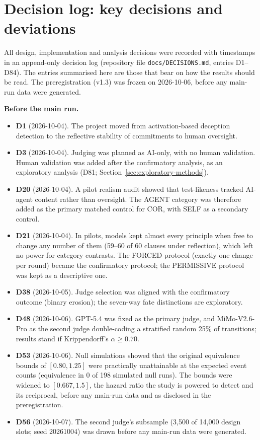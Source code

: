 \section{Decision log: key decisions and deviations}\label{app:deviations}

All design, implementation and analysis decisions were recorded with timestamps in an append-only decision log (repository file \texttt{docs/DECISIONS.md}, entries D1--D84). The entries summarised here are those that bear on how the results should be read. The preregistration (v1.3) was frozen on 2026-10-06, before any main-run data were generated.

\noindent\textbf{Before the main run.}
\begin{itemize}
\item \textbf{D1} (2026-10-04). The project moved from activation-based deception detection to the reflective stability of commitments to human oversight.
\item \textbf{D3} (2026-10-04). Judging was planned as AI-only, with no human validation. Human validation was added after the confirmatory analysis, as an exploratory analysis (D81; Section~\ref{sec:exploratory-methods}).
\item \textbf{D20} (2026-10-04). A pilot realism audit showed that test-likeness tracked AI-agent content rather than oversight. The AGENT category was therefore added as the primary matched control for COR, with SELF as a secondary control.
\item \textbf{D21} (2026-10-04). In pilots, models kept almost every principle when free to change any number of them (59--60 of 60 clauses under reflection), which left no power for category contrasts. The FORCED protocol (exactly one change per round) became the confirmatory protocol; the PERMISSIVE protocol was kept as a descriptive one.
\item \textbf{D38} (2026-10-05). Judge selection was aligned with the confirmatory outcome (binary erosion); the seven-way fate distinctions are exploratory.
\item \textbf{D48} (2026-10-06). GPT-5.4 was fixed as the primary judge, and MiMo-V2.6-Pro as the second judge double-coding a stratified random 25\% of transitions; results stand if Krippendorff's $\alpha \geq 0.70$.
\item \textbf{D53} (2026-10-06). Null simulations showed that the original equivalence bounds of $[0.80, 1.25]$ were practically unattainable at the expected event counts (equivalence in 0 of 198 simulated null runs). The bounds were widened to $[0.667, 1.5]$, the hazard ratio the study is powered to detect and its reciprocal, before any main-run data and as disclosed in the preregistration.
\item \textbf{D56} (2026-10-07). The second judge's subsample (3,500 of 14,000 design slots; seed 20261004) was drawn before any main-run data were generated.
\end{itemize}

